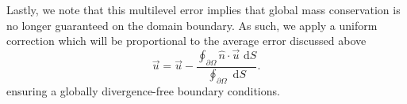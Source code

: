 \documentclass[preprint,12pt]{elsarticle}
\begin{document}

Lastly, we note that this multilevel error implies that global mass conservation is no longer guaranteed on the domain boundary. As such, we apply a uniform correction which will be proportional to the average error discussed above
\begin{equation}
    \vec{u} = \vec{u} -\frac {\oint_{\partial\Omega }\hat{n}\cdot\vec{u}\text{ d}S} {\oint_{\partial\Omega }\text{ d}S}.
\end{equation}
ensuring a globally divergence-free boundary conditions.



\end{document}
